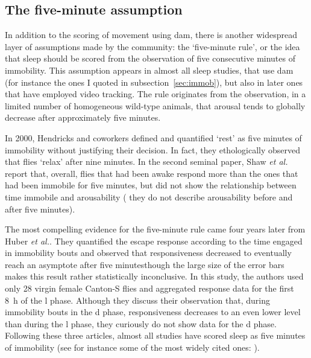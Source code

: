\subsection{The five-minute assumption}
In addition to the scoring of movement using \gls{dam}, there is another widespread layer of assumptions made by the community: the `five-minute rule', or the idea that sleep should be scored from the observation of five consecutive minutes of immobility.
This assumption appears in almost all sleep studies, that use \gls{dam} (for instance the ones I quoted in subsection~\ref{sec:immob}), but also in later ones that have employed video tracking.
The rule originates from the observation, in a limited number of homogeneous wild-type animals, that
arousal tends to globally decrease after approximately five minutes\cite{hendricks_rest_2000,shaw_correlates_2000,huber_sleep_2004}.

In 2000, Hendricks and coworkers defined and quantified `rest' as five minutes of immobility without justifying their decision.
In fact, they ethologically observed that flies `relax' after nine minutes.
In the second seminal paper, Shaw \emph{et al.} report that, overall, flies that had been awake respond more than the ones that had been immobile for five minutes, but did not show the relationship between time immobile and arousability (\ie{} they do not describe arousability before and after five minutes)\cite{shaw_correlates_2000}.

The most compelling evidence for the five-minute rule came four years later from Huber \emph{et al.}\cite{huber_sleep_2004}.
They quantified the escape response according to the time engaged in immobility bouts and observed
that responsiveness decreased to eventually reach an asymptote after five minutes\cite[fig.~2]{huber_sleep_2004}\emd{}though the large size of the error bars makes this result rather statistically inconclusive.
In this study, the authors used only 28 virgin female Canton-S flies and aggregated response data for the first 8~h of the \gls{l} phase.
Although they discuss their observation that, during immobility bouts in the \gls{d} phase, responsiveness decreases to an even lower level than during the \gls{l} phase, they curiously do not show data for the \gls{d} phase.
Following these three articles, almost all studies have scored sleep as five minutes of immobility\cite{faville_how_2015} (see for instance some of the most widely cited ones: \cite{joiner_sleep_2006,pitman_dynamic_2006,cirelli_reduced_2005,kume_dopamine_2005}).


